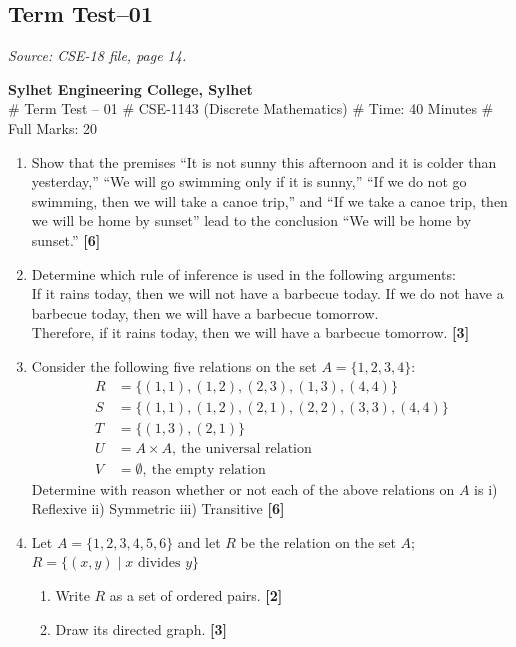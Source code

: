 \documentclass[11pt,a4paper]{article}
\newcommand{\mk}[1]{\hfill\textbf{[#1]}}
\newcommand{\srcnote}[1]{{\footnotesize\itshape Source: #1}\par\smallskip}
\newenvironment{Ql}{\begin{enumerate}[leftmargin=2.5em,labelsep=0.4em,itemsep=5pt,topsep=2pt]}{\end{enumerate}}
\newenvironment{Sl}{\begin{enumerate}[leftmargin=2.3em,labelsep=0.3em,itemsep=3pt,topsep=2pt]}{\end{enumerate}}
\begin{document}
\subsection{Term Test--01}
\srcnote{CSE-18 file, page 14.}
\begin{center}
{\bfseries Sylhet Engineering College, Sylhet}\\
\# Term Test -- 01 \quad \# CSE-1143 (Discrete Mathematics) \quad \# Time: 40 Minutes \quad \# Full Marks: 20
\end{center}
\begin{Ql}
\item Show that the premises ``It is not sunny this afternoon and it is colder than yesterday,'' ``We will go swimming only if it is sunny,'' ``If we do not go swimming, then we will take a canoe trip,'' and ``If we take a canoe trip, then we will be home by sunset'' lead to the conclusion ``We will be home by sunset.'' \mk{6}
\item Determine which rule of inference is used in the following arguments:\\
 If it rains today, then we will not have a barbecue today. If we do not have a barbecue today, then we will have a barbecue tomorrow.\\
 Therefore, if it rains today, then we will have a barbecue tomorrow. \mk{3}
\item Consider the following five relations on the set $A=\{1,2,3,4\}$:
 \begin{align*}
 R&=\{(1,1),(1,2),(2,3),(1,3),(4,4)\}\\
 S&=\{(1,1),(1,2),(2,1),(2,2),(3,3),(4,4)\}\\
 T&=\{(1,3),(2,1)\}\\
 U&=A\times A,\ \text{the universal relation}\\
 V&=\emptyset,\ \text{the empty relation}
 \end{align*}
 Determine with reason whether or not each of the above relations on $A$ is i) Reflexive ii) Symmetric iii) Transitive \mk{6}
\item Let $A=\{1,2,3,4,5,6\}$ and let $R$ be the relation on the set $A$; $R=\{(x,y)\mid x \text{ divides } y\}$
 \begin{Sl}
 \item[i)] Write $R$ as a set of ordered pairs. \mk{2}
 \item[ii)] Draw its directed graph. \mk{3}
 \end{Sl}
\end{Ql}
\end{document}
